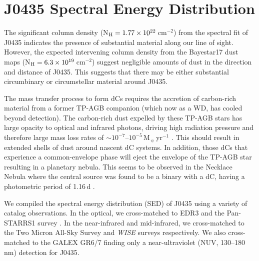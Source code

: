 \documentclass[twocolumn, tighten, times, astrosymb]{aastex631}
\begin{document}
\section{J0435 Spectral Energy Distribution}\label{sec:J0435_SED}

The significant column density (N$_{\rm H} = 1.77\times10^{22}$\,cm$^{-2}$) from the spectral fit of J0435 indicates the presence of substantial material along our line of sight. However, the expected intervening column density from the Bayestar17 dust maps (N$_{\rm H} = 6.3\times10^{19}$\,cm$^{-2}$) suggest negligible amounts of dust in the direction and distance of J0435. This suggests that there may be either substantial circumbinary or circumstellar material around J0435. 

The mass transfer process to form dCs requires the accretion of carbon-rich material from a former TP-AGB companion (which now as a WD, has cooled beyond detection). The carbon-rich dust expelled by these TP-AGB stars has large opacity to optical and infrared photons, driving high radiation pressure and therefore large mass loss rates of $\sim 10^{-7}$--$10^{-5}$\,M$_\sun$\,yr$^{-1}$ \citep{Hofner2018}. This should result in extended shells of dust around nascent dC systems. In addition, those dCs that experience a common-envelope phase will eject the envelope of the TP-AGB star resulting in a planetary nebula. This seems to be observed in the Necklace Nebula where the central source was found to be a binary with a dC, having a photometric period of 1.16\,d \citep{Corradi2011, Miszalski2013}.

We compiled the spectral energy distribution (SED) of J0435 using a variety of catalog observations. In the optical, we cross-matched to \Gaia EDR3 \citep{GaiaEDR3} and the Pan-STARRS1 survey \citep{PanSTARRS1-1, PanSTARRS1-2, PanSTARRS1-3, PanSTARRS1-4, PanSTARRS1-5, PanSTARRS1-6}. In the near-infrared and mid-infrared, we cross-matched to the Two Micron All-Sky Survey \citep[2MASS;][]{2MASS} and \textit{WISE} surveys respectively. We also cross-matched to the GALEX GR6/7 \citep{GALEX} finding only a near-ultraviolet (NUV, 130–180 nm) detection for J0435.
\end{document}
